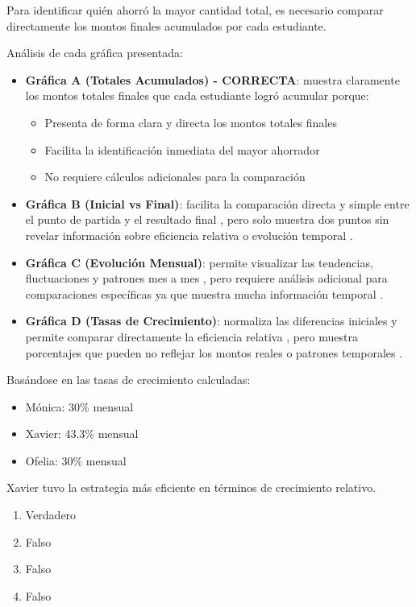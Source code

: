 \documentclass[12pt,a4paper]{article}
\newenvironment{solution}{}{}
\newenvironment{answerlist}{\begin{enumerate}}{\end{enumerate}}
\begin{document}
\begin{solution}

Para identificar quién ahorró la mayor cantidad total, es necesario comparar directamente los montos finales acumulados por cada estudiante. \par\vspace{0.5cm}Análisis de cada gráfica presentada:\begin{itemize}\item \textbf{Gráfica A (Totales Acumulados) - CORRECTA}: muestra claramente los montos totales finales que cada estudiante logró acumular  porque:
  \begin{itemize}
  \item Presenta de forma clara y directa los montos totales finales
  \item Facilita la identificación inmediata del mayor ahorrador
  \item No requiere cálculos adicionales para la comparación
  \end{itemize}

\item \textbf{Gráfica B (Inicial vs Final)}: facilita la comparación directa y simple entre el punto de partida y el resultado final , pero  solo muestra dos puntos sin revelar información sobre eficiencia relativa o evolución temporal .

\item \textbf{Gráfica C (Evolución Mensual)}: permite visualizar las tendencias, fluctuaciones y patrones mes a mes , pero  requiere análisis adicional para comparaciones específicas ya que muestra mucha información temporal .

\item \textbf{Gráfica D (Tasas de Crecimiento)}: normaliza las diferencias iniciales y permite comparar directamente la eficiencia relativa , pero  muestra porcentajes que pueden no reflejar los montos reales o patrones temporales .\end{itemize}
\par\vspace{0.5cm}

Basándose en las tasas de crecimiento calculadas:
\begin{itemize}
\item Mónica: 30\% mensual
\item Xavier: 43.3\% mensual
\item Ofelia: 30\% mensual
\end{itemize}

\par\vspace{0.5cm}

Xavier tuvo la estrategia más eficiente en términos de crecimiento relativo.

\begin{answerlist}
  \item Verdadero
  \item Falso
  \item Falso
  \item Falso
\end{answerlist}
\end{solution}

\end{document}
